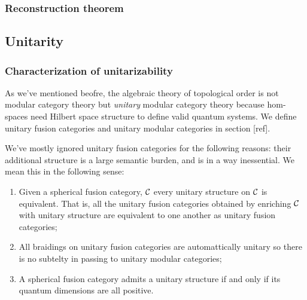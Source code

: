 \subsubsection{Reconstruction theorem}

\subsection{Unitarity}

\subsubsection{Characterization of unitarizability}



As we've mentioned beofre, the algebraic theory of topological order is not modular category theory but {\em unitary} modular category theory because hom-spaces need Hilbert space structure to define valid quantum systems. We define unitary fusion categories and unitary modular categories in section [ref].

We've mostly ignored unitary fusion categories for the following reasons: their additional structure is a large semantic burden, and is in a way inessential. We mean this in the following sense:

\begin{enumerate}
\item Given a spherical fusion category, ${\mathcal C}$ every unitary structure on ${\mathcal C}$ is equivalent. That is, all the unitary fusion categories obtained by enriching ${\mathcal C}$ with unitary structure are equivalent to one another as unitary fusion categories;

\item All braidings on unitary fusion categories are automattically unitary so there is no subtelty in passing to unitary modular categories;

\item A spherical fusion category admits a unitary structure if and only if its quantum dimensions are all positive.
\end{enumerate}

